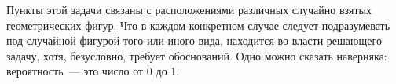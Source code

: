 \def\mb#1{\mathbb{#1}}
\newcommand{\ol}[1]{\overline{#1}}
\newcommand{\tbf}[1]{\textbf{#1}}

\newcommand\ccup{\mathop{\cup}}
\def\dist{\operatorname{dist}}
\newcommand{\id}{\operatorname{Id}}

\def\bar{\begin{array}}
\def\ear{\end{array}}
\newcommand{\Vol}{\operatorname{Vol}}


Пункты этой задачи связаны с расположениями различных случайно взятых геометрических фигур. Что в каждом конкретном случае следует подразумевать под случайной фигурой того или иного вида, находится во власти решающего задачу, хотя, безусловно, требует обоснований. Одно можно сказать наверняка: вероятность~— это число от 0 до 1.
